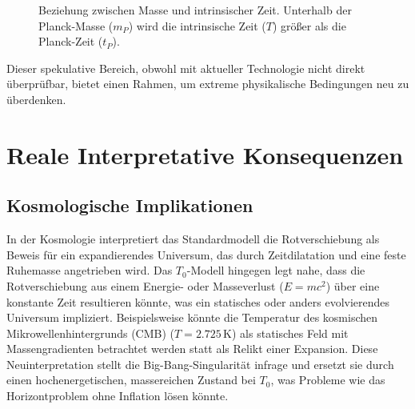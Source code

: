 \documentclass[a4paper,12pt]{article}
\begin{document}
	\begin{figure}[h]
		\centering
		\caption{Beziehung zwischen Masse und intrinsischer Zeit. Unterhalb der Planck-Masse (\(m_P\)) wird die intrinsische Zeit (\(T\)) größer als die Planck-Zeit (\(t_P\)).}
	\end{figure}
	
	Dieser spekulative Bereich, obwohl mit aktueller Technologie nicht direkt überprüfbar, bietet einen Rahmen, um extreme physikalische Bedingungen neu zu überdenken.
	
	\section{Reale Interpretative Konsequenzen}
	\subsection{Kosmologische Implikationen}
	In der Kosmologie interpretiert das Standardmodell die Rotverschiebung als Beweis für ein expandierendes Universum, das durch Zeitdilatation und eine feste Ruhemasse angetrieben wird. Das \( T_0 \)-Modell hingegen legt nahe, dass die Rotverschiebung aus einem Energie- oder Masseverlust (\( E = m c^2 \)) über eine konstante Zeit resultieren könnte, was ein statisches oder anders evolvierendes Universum impliziert. Beispielsweise könnte die Temperatur des kosmischen Mikrowellenhintergrunds (CMB) (\( T = 2.725 \, \text{K} \)) als statisches Feld mit Massengradienten betrachtet werden statt als Relikt einer Expansion. Diese Neuinterpretation stellt die Big-Bang-Singularität infrage und ersetzt sie durch einen hochenergetischen, massereichen Zustand bei \( T_0 \), was Probleme wie das Horizontproblem ohne Inflation lösen könnte.
	
\end{document}
